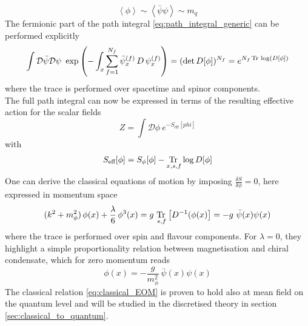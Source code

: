 \begin{equation*}
    \left\langle \phi \right\rangle \sim \left\langle \bar \psi \psi \right\rangle \sim m_q
\end{equation*}
The fermionic part of the path integral \eqref{eq:path_integral_generic} can be performed explicitly
\begin{equation*}
    \int \mathcal{D} \bar\psi \mathcal{D} \psi \ \exp\left( - \int_x \sum_{f=1}^{N_f} \bar\psi_x^{(f)} \,  D \, \psi_x^{(f)} \right) = (\text{det} \, D[\phi])^{N_f} = e^{N_f\operatorname{\text{Tr} \,} \log (D[\phi])}
\end{equation*}
where the trace is performed over spacetime and spinor components. \\ 
The full path integral can now be expressed in terms of the resulting effective action for the scalar fields
\begin{equation*}
    Z = \int \mathcal{D}\phi \ e^{-S_\text{eff}[phi]}
\end{equation*}
with
\begin{equation}
    S_\text{eff}[\phi] = S_{\phi}[\phi] - \underset{x,s,f}{\operatorname{\text{Tr} \,}} \log D[\phi]
    \label{eq:effective_action_no_fermions}
\end{equation}
One can derive the classical equations of motion by imposing $\frac{\delta S}{\delta \phi} = 0$, here expressed in momentum space
\begin{equation*}
     (k^2 + m_\phi^2) \, \phi(x) + \frac{\lambda}{6} \, \phi^3(x) = g \ \underset{s,f}{\tr} \left[D^{-1}(\phi(x)\right] = - g \ \bar\psi(x) \psi(x)
\end{equation*}
where the trace is performed over spin and flavour components. For $\lambda = 0$, they highlight a simple proportionality relation between magnetisation and chiral condensate, which for zero momentum reads
\begin{equation}
    \phi(x) = - \frac{g}{m_\phi^2} \ \bar \psi(x) \psi(x)
    \label{eq:classical_EOM}
\end{equation}
The classical relation \eqref{eq:classical_EOM} is proven to hold also at mean field on the quantum level \cite{Buballa2005NJL-modelMatter} and will be studied in the discretised theory in section \ref{sec:classical_to_quantum}. \\~\\


